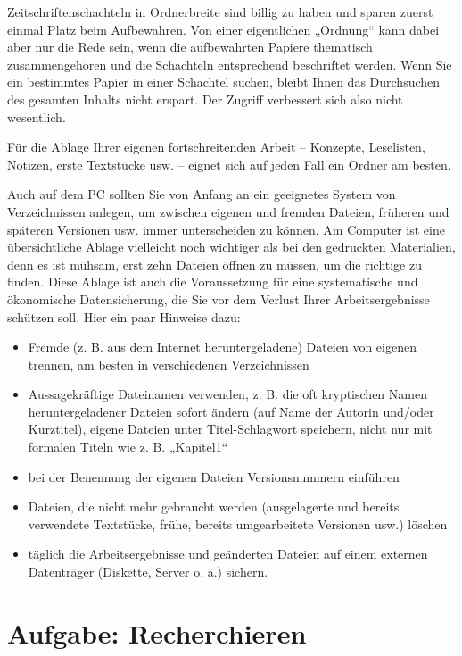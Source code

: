 \documentclass[]{book}
\providecommand{\tightlist}{%
  \setlength{\itemsep}{0pt}\setlength{\parskip}{0pt}}
\theoremstyle{definition}
\theoremstyle{definition}
\theoremstyle{definition}
\theoremstyle{remark}
\begin{document}
Zeitschriftenschachteln in Ordnerbreite sind billig zu haben und sparen
zuerst einmal Platz beim Aufbewahren. Von einer eigentlichen „Ordnung``
kann dabei aber nur die Rede sein, wenn die aufbewahrten Papiere
thematisch zusammengehören und die Schachteln entsprechend beschriftet
werden. Wenn Sie ein bestimmtes Papier in einer Schachtel suchen, bleibt
Ihnen das Durchsuchen des gesamten Inhalts nicht erspart. Der Zugriff
verbessert sich also nicht wesentlich.

Für die Ablage Ihrer eigenen fortschreitenden Arbeit -- Konzepte,
Leselisten, Notizen, erste Textstücke usw. -- eignet sich auf jeden Fall
ein Ordner am besten.

Auch auf dem PC sollten Sie von Anfang an ein geeignetes System von
Verzeichnissen anlegen, um zwischen eigenen und fremden Dateien,
früheren und späteren Versionen usw. immer unterscheiden zu können. Am
Computer ist eine übersichtliche Ablage vielleicht noch wichtiger als
bei den gedruckten Materialien, denn es ist mühsam, erst zehn Dateien
öffnen zu müssen, um die richtige zu finden. Diese Ablage ist auch die
Voraussetzung für eine systematische und ökonomische Datensicherung, die
Sie vor dem Verlust Ihrer Arbeitsergebnisse schützen soll. Hier ein paar
Hinweise dazu:

\begin{itemize}
\tightlist
\item
  Fremde (z. B. aus dem Internet heruntergeladene) Dateien von eigenen
  trennen, am besten in verschiedenen Verzeichnissen
\item
  Aussagekräftige Dateinamen verwenden, z. B. die oft kryptischen Namen
  heruntergeladener Dateien sofort ändern (auf Name der Autorin und/oder
  Kurztitel), eigene Dateien unter Titel-Schlagwort speichern, nicht nur
  mit formalen Titeln wie z. B. „Kapitel1``
\item
  bei der Benennung der eigenen Dateien Versionsnummern einführen
\item
  Dateien, die nicht mehr gebraucht werden (ausgelagerte und bereits
  verwendete Textstücke, frühe, bereits umgearbeitete Versionen usw.)
  löschen
\item
  täglich die Arbeitsergebnisse und geänderten Dateien auf einem
  externen Datenträger (Diskette, Server o. ä.) sichern.
\end{itemize}

\section{Aufgabe: Recherchieren}\label{aufgabe-recherchieren}
\end{document}
